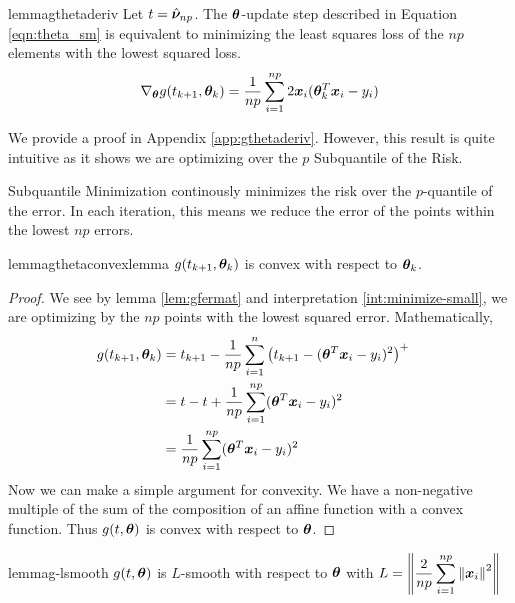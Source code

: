 \documentclass{article} %
\newcommand{\norm}[1]{\left\lVert#1\right\rVert}
\begin{document}
	\begin{restatable}{lemma}{gthetaderiv}\label{lem:gthetaderiv}
		Let $t = \hat{{\bm{\nu}}}_{np}$. The ${\bm{\theta}}$-update step described in Equation \ref{eqn:theta_sm} is equivalent to minimizing the least squares loss of the $np$ elements with the lowest squared loss.
	   \begin{equation}
			\nabla_{{\bm{\theta}}}g(t_{k+1},{\bm{\theta}}_k) = \frac{1}{np}\sum_{i=1}^{np}2{\bm{x}}_i({\bm{\theta}}_k^T{\bm{x}}_i - y_i)
		\end{equation}
	\end{restatable}
	We provide a proof in Appendix \ref{app:gthetaderiv}. However, this result is quite intuitive as it shows we are optimizing over the $p$ Subquantile of the Risk.
	\begin{interpretation}
		\label{int:minimize-small}
		Subquantile Minimization continously minimizes the risk over the $p$-quantile of the error. In each iteration, this means we reduce the error of the points within the lowest $np$ errors.
	\end{interpretation}

		
	\begin{restatable}{lemma}{gthetaconvexlemma}
		\label{lem:gthetaconvex}
		$g(t_{k+1},{\bm{\theta}}_k)$ is convex with respect to ${\bm{\theta}}_k$.
	\end{restatable}
	\begin{proof}
		We see by lemma \ref{lem:gfermat} and interpretation \ref{int:minimize-small}, we are optimizing by the $np$ points with the lowest squared error. Mathematically, 
		\begin{align*}
			g(t_{k+1},{\bm{\theta}}_k) &= t_{k+1} - \frac{1}{np}\sum_{i=1}^{n}\left(t_{k+1} - ({\bm{\theta}}^T{\bm{x}}_i - y_i)^2\right)^+ &&\\
			&= t - t + \frac{1}{np}\sum_{i=1}^{np}({\bm{\theta}}^T{\bm{x}}_i - y_i)^2 &&\\
			&= \frac{1}{np}\sum_{i=1}^{np}({\bm{\theta}}^T{\bm{x}}_i - y_i)^2 &&
		\end{align*}
		Now we can make a simple argument for convexity. We have a non-negative multiple of the sum of the composition of an affine function with a convex function. Thus $g(t,{\bm{\theta}})$ is convex with respect to ${\bm{\theta}}$.
	\end{proof}
	
	\begin{restatable}{lemma}{g-lsmooth}
		\label{lem:g-lsmooth}
		$g(t,{\bm{\theta}})$ is $L$-smooth with respect to ${\bm{\theta}}$ with $\displaystyle L = \norm{\frac{2}{np}\sum_{i=1}^{np}\norm{\vx_i}^2}$ 
	\end{restatable}
	
\end{document}
